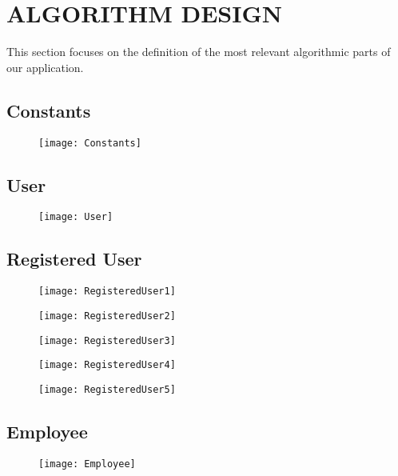 \section{ALGORITHM DESIGN}
This section focuses on the definition of the most relevant algorithmic parts of our application.
\subsection{Constants}
\begin{figure}[H]
	\centering
	\texttt{[image: Constants]}
\end{figure}
\subsection{User}
\begin{figure}[H]
	\centering
	\texttt{[image: User]}
\end{figure}
\subsection{Registered User}
\begin{figure}[H]
	\centering
	\texttt{[image: RegisteredUser1]}
\end{figure}
\begin{figure}[H]
	\centering
	\texttt{[image: RegisteredUser2]}
\end{figure}
\begin{figure}[H]
	\centering
	\texttt{[image: RegisteredUser3]}
\end{figure}
\begin{figure}[H]
	\centering
	\texttt{[image: RegisteredUser4]}
\end{figure}
\begin{figure}[H]
	\centering
	\texttt{[image: RegisteredUser5]}
\end{figure}
\subsection{Employee}
\begin{figure}[H]
	\centering
	\texttt{[image: Employee]}
\end{figure}
